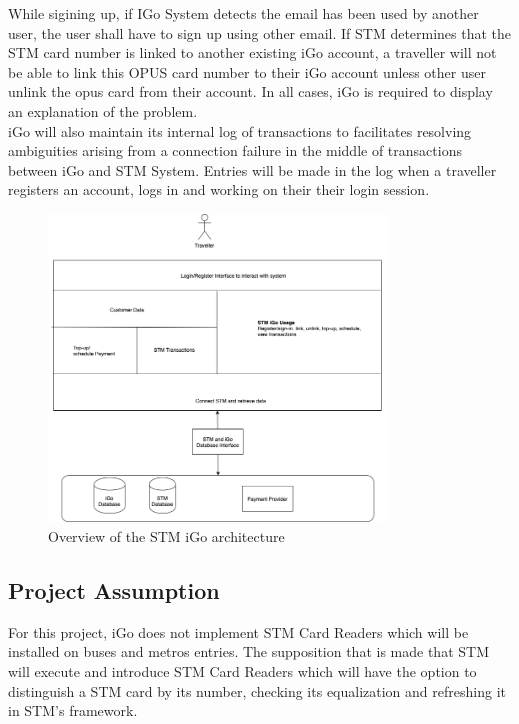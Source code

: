 \documentclass[11pt, english]{report}
\begin{document}
While sigining up, if IGo System detects the email has been used by another user, the user shall have to sign up using other email. If STM determines that the STM card number is linked to another existing iGo account, a traveller will not be able to link this OPUS card number to their iGo account unless other user unlink the opus card from their account. In all cases, iGo is required to display an explanation of the problem. \\

iGo will also maintain its internal log of transactions to facilitates resolving ambiguities arising from a connection failure in the middle of transactions between iGo and STM System. Entries will be made in the log when a traveller registers an account, logs in and  working on their their login session. \\

\begin{figure}[H]
  
  \includegraphics[width=0.8\textwidth]{images/arch.png}
  \centering
  \caption{ Overview of the STM iGo architecture}

\end{figure}

\subsection{Project Assumption}

For this project, iGo does not implement STM Card Readers which will be installed on buses and metros entries. The supposition that is made that STM will execute and introduce STM Card Readers which will have the option to distinguish a STM card by its number, checking its equalization and refreshing it in STM's framework.
\end{document}

